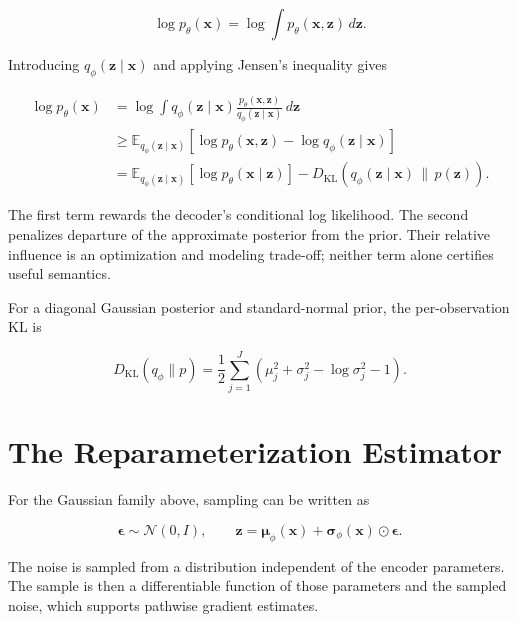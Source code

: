 \documentclass{article}
\begin{document}
\[
\log p_{\theta}(\mathbf{x})
=\log\int p_{\theta}(\mathbf{x},\mathbf{z})\,d\mathbf{z}.
\]

Introducing $q_{\phi}(\mathbf{z}\mid\mathbf{x})$ and applying Jensen's inequality
gives

\begin{align*}
\log p_{\theta}(\mathbf{x})
&=\log\int q_{\phi}(\mathbf{z}\mid\mathbf{x})
\frac{p_{\theta}(\mathbf{x},\mathbf{z})}
{q_{\phi}(\mathbf{z}\mid\mathbf{x})}\,d\mathbf{z}\\
&\geq
\mathbb{E}_{q_{\phi}(\mathbf{z}\mid\mathbf{x})}
\left[
\log p_{\theta}(\mathbf{x},\mathbf{z})
-\log q_{\phi}(\mathbf{z}\mid\mathbf{x})
\right]\\
&=
\mathbb{E}_{q_{\phi}(\mathbf{z}\mid\mathbf{x})}
[\log p_{\theta}(\mathbf{x}\mid\mathbf{z})]
-D_{\mathrm{KL}}\!\left(
q_{\phi}(\mathbf{z}\mid\mathbf{x})\,\|\,p(\mathbf{z})
\right).
\end{align*}

The first term rewards the decoder's conditional log likelihood. The second penalizes
departure of the approximate posterior from the prior. Their relative influence is an
optimization and modeling trade-off; neither term alone certifies useful semantics.

For a diagonal Gaussian posterior and standard-normal prior, the per-observation KL is

\[
D_{\mathrm{KL}}(q_{\phi}\|p)
=\frac{1}{2}\sum_{j=1}^{J}
\left(
\mu_j^2+\sigma_j^2-\log\sigma_j^2-1
\right).
\]


\section{The Reparameterization Estimator}

For the Gaussian family above, sampling can be written as

\[
\boldsymbol{\epsilon}\sim\mathcal{N}(0,I),
\qquad
\mathbf{z}
=\boldsymbol{\mu}_{\phi}(\mathbf{x})
+\boldsymbol{\sigma}_{\phi}(\mathbf{x})\odot\boldsymbol{\epsilon}.
\]

The noise is sampled from a distribution independent of the encoder parameters. The
sample is then a differentiable function of those parameters and the sampled noise,
which supports pathwise gradient estimates.
\end{document}
